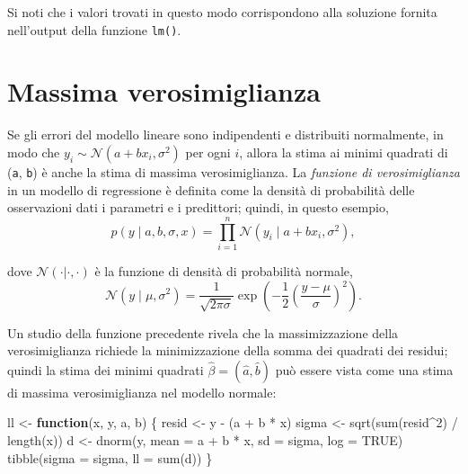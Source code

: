 \documentclass[
  10pt,
  italian,
  a4paper,
  extrafontsizes,onecolumn,openright
  ]{memoir}
\newenvironment{Shaded}{\begin{snugshade}}{\end{snugshade}}
\newcommand{\AttributeTok}[1]{\textcolor[rgb]{0.77,0.63,0.00}{#1}}
\newcommand{\ConstantTok}[1]{\textcolor[rgb]{0.00,0.00,0.00}{#1}}
\newcommand{\ControlFlowTok}[1]{\textcolor[rgb]{0.13,0.29,0.53}{\textbf{#1}}}
\newcommand{\DecValTok}[1]{\textcolor[rgb]{0.00,0.00,0.81}{#1}}
\newcommand{\FunctionTok}[1]{\textcolor[rgb]{0.00,0.00,0.00}{#1}}
\newcommand{\NormalTok}[1]{#1}
\newcommand{\OtherTok}[1]{\textcolor[rgb]{0.56,0.35,0.01}{#1}}
\newcommand{\SpecialCharTok}[1]{\textcolor[rgb]{0.00,0.00,0.00}{#1}}
\begin{document}
Si noti che i valori trovati in questo modo corrispondono alla soluzione fornita nell'output della funzione \texttt{lm()}.

\hypertarget{massima-verosimiglianza}{%
\section{Massima verosimiglianza}\label{massima-verosimiglianza}}

Se gli errori del modello lineare sono indipendenti e distribuiti normalmente, in modo che \(y_i \sim \mathcal{N}(a + b x_i, \sigma^2)\) per ogni \(i\), allora la stima ai minimi quadrati di (\texttt{a}, \texttt{b}) è anche la stima di massima verosimiglianza. La \emph{funzione di verosimiglianza} in un modello di regressione è definita come la densità di probabilità delle osservazioni dati i parametri e i predittori; quindi, in questo esempio,
\[
 p(y \mid a, b, \sigma, x) = \prod_{i=1}^n \mathcal{N}(y_i \mid a + b x_i, \sigma^2),
 \]

dove \(\mathcal{N}(\cdot | \cdot, \cdot)\) è la funzione di densità di probabilità normale,
\[
\mathcal{N}(y \mid \mu, \sigma^2) = \frac{1}{\sqrt{2 \pi \sigma}} \exp \left(-\frac{1}{2} \left( \frac{y - \mu}{\sigma} \right)^2 \right).
\]

Un studio della funzione precedente rivela che la massimizzazione della verosimiglianza richiede la minimizzazione della somma dei quadrati dei residui; quindi la stima dei minimi quadrati \(\hat{\beta} = (\hat{a}, \hat{b})\) può essere vista come una stima di massima verosimiglianza nel modello normale:

\begin{Shaded}
\begin{Highlighting}[]
\NormalTok{ll }\OtherTok{\textless{}{-}} \ControlFlowTok{function}\NormalTok{(x, y, a, b) \{}
\NormalTok{  resid }\OtherTok{\textless{}{-}}\NormalTok{ y }\SpecialCharTok{{-}}\NormalTok{ (a }\SpecialCharTok{+}\NormalTok{ b }\SpecialCharTok{*}\NormalTok{ x)}
\NormalTok{  sigma }\OtherTok{\textless{}{-}} \FunctionTok{sqrt}\NormalTok{(}\FunctionTok{sum}\NormalTok{(resid}\SpecialCharTok{\^{}}\DecValTok{2}\NormalTok{) }\SpecialCharTok{/} \FunctionTok{length}\NormalTok{(x))}
\NormalTok{  d }\OtherTok{\textless{}{-}} \FunctionTok{dnorm}\NormalTok{(y, }\AttributeTok{mean =}\NormalTok{ a }\SpecialCharTok{+}\NormalTok{ b }\SpecialCharTok{*}\NormalTok{ x, }\AttributeTok{sd =}\NormalTok{ sigma, }\AttributeTok{log =} \ConstantTok{TRUE}\NormalTok{)}
  \FunctionTok{tibble}\NormalTok{(}\AttributeTok{sigma =}\NormalTok{ sigma, }\AttributeTok{ll =} \FunctionTok{sum}\NormalTok{(d))}
\NormalTok{\}}
\end{Highlighting}
\end{Shaded}
\end{document}
